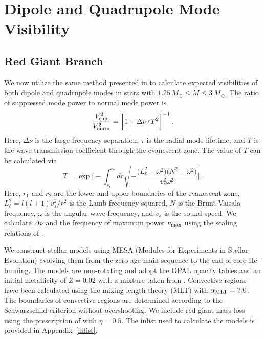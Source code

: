 \section{Dipole and Quadrupole Mode Visibility}\label{visibility}


\subsection{Red Giant Branch}
\label{rgb}


We now utilize the same method presented in \citet{Fuller_2015} to calculate expected visibilities of both dipole and quadrupole modes in stars with $1.25 \, M_\odot \leq M \leq 3 \, M_\odot$. The ratio of suppressed mode power to normal mode power is
\begin{equation}
\label{eqn:vsup}
\frac{V_{\rm sup}^2}{V_{\rm norm}^2} = \bigg[ 1 + \Delta \nu \tau T^2 \bigg]^{-1} \, .
\end{equation}
Here, $\Delta \nu$ is the large frequency separation, $\tau$ is the radial mode lifetime, and $T$ is the wave transmission coefficient through the evanescent zone. The value of $T$ can be calculated via
\begin{equation}
\label{eqn:T}
T  = \exp \bigg[ - \int^{r_2}_{r_1} dr \sqrt{ - \frac{ \big( L_\ell^2 - \omega^2 \big) \big(N^2 - \omega^2 \big) }{v_s^2 \omega^2} } \bigg] \, .
\end{equation}
Here, $r_1$ and $r_2$ are the lower and upper boundaries of the evanescent zone, $L_\ell^2 = l(l+1)v_s^2/r^2$ is the Lamb frequency squared, $N$ is the Brunt-Vaisala frequency, $\omega$ is the angular wave frequency, and $v_s$ is the sound speed. We calculate $\Delta \nu$ and the frequency of maximum power $\nu_{\rm max}$ using the scaling relations of \cite{Huber_2011}.

We construct stellar models using MESA (Modules for Experiments in Stellar Evolution) \citep[MESA,release 7456][]{Paxton_2010,Paxton_2013,Paxton_2015} evolving them from the zero age main sequence to the end of core He-burning. The models are non-rotating and adopt the OPAL opacity tables \citep{Iglesias:96} and an initial metallicity of $Z=0.02$ with a mixture taken from \citet{Asplund:2005}.  
Convective regions have been calculated using the mixing-length theory (MLT) with $\alpha_{\rm MLT}=2.0$. The boundaries of convective regions are determined according to the Schwarzschild criterion without overshooting. We include red giant mass-loss using the prescription of \citet{Reimers:1975} with $\eta=0.5$. The inlist used to calculate the models is provided in Appendix~\ref{inlist}.
  
